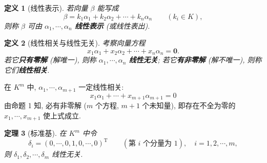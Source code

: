 \documentclass[UTF8,11pt]{ctexart}
\theoremstyle{cnthm}
\newtheorem{thm}{定理}[section]
\newtheorem{defn}[thm]{定义}
\begin{document}
\begin{defn}[线性表示]
若向量 $\beta$ 能写成
\[
\beta=k_1\alpha_1+k_2\alpha_2+\cdots+k_n\alpha_n\qquad(k_i\in K),
\]
则称 $\beta$ 可由 $\alpha_1,\cdots,\alpha_n$ \textbf{线性表示} (或线性表出).
\end{defn}

\begin{defn}[线性相关与线性无关]
考察向量方程
\[
x_1\alpha_1+x_2\alpha_2+\cdots+x_n\alpha_n=\mathbf{0}.
\]
若它\textbf{只有零解} (解唯一), 则称 $\alpha_1,\cdots,\alpha_n$ \textbf{线性无关}; 若它\textbf{有非零解} (解不唯一), 则称它们\textbf{线性相关}.
\end{defn}

在 $K^m$ 中, $\alpha_1,\cdots,\alpha_{m+1}$ 一定线性相关:
\[
x_1\alpha_1+\cdots+x_{m+1}\alpha_{m+1}=0
\]
由命题 1 知, 必有非零解 ($m$ 个方程, $m+1$ 个未知量), 即存在不全为零的 $x_1,\cdots,x_{m+1}$ 使上式成立.

\begin{thm}[标准基]
在 $K^m$ 中令
\[
\delta_i=(0,\cdots,0,1,0,\cdots,0)^{\mathrm T}
\qquad(\text{第 } i \text{ 个分量为 } 1),\quad i=1,2,\cdots,m,
\]
则 $\delta_1,\delta_2,\cdots,\delta_m$ 线性无关.
\end{thm}
\end{document}
